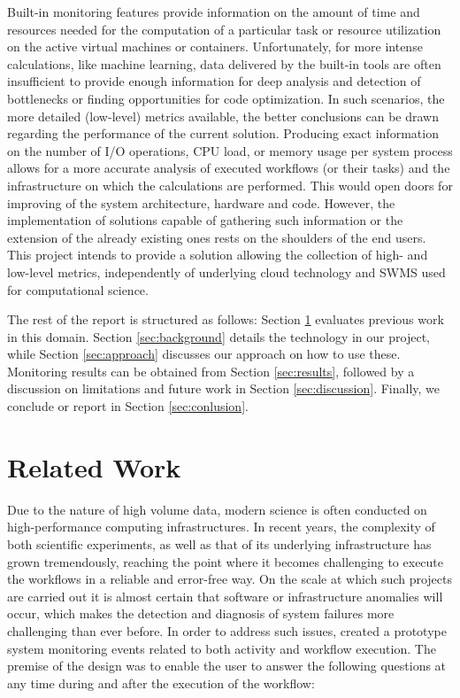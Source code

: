 \documentclass[a4paper,journal]{IEEEtran}
\begin{document}
Built-in monitoring features provide information on the amount of time and resources needed for the computation of a particular task or resource utilization on the active virtual machines or containers. Unfortunately, for more intense calculations, like machine learning, data delivered by the built-in tools are often insufficient to provide enough information for deep analysis and detection of bottlenecks or finding opportunities for code optimization. In such scenarios, the more detailed (low-level) metrics available, the better conclusions can be drawn regarding the performance of the current solution. Producing exact information on the number of I/O operations, CPU load, or memory usage per system process allows for a more accurate analysis of executed workflows (or their tasks) and the infrastructure on which the calculations are performed. This would open doors for improving of the system architecture, hardware and code. However, the implementation of solutions capable of gathering such information or the extension of the already existing ones rests on the shoulders of the end users. This project intends to provide a solution allowing the collection of high- and low-level metrics, independently of underlying cloud technology and SWMS used for computational science.

The rest of the report is structured as follows: Section \ref{sec:related-work} evaluates previous work in this domain. Section \ref{sec:background} details the technology in our project, while Section \ref{sec:approach} discusses our approach on how to use these. Monitoring results can be obtained from Section \ref{sec:results}, followed by a discussion on limitations and future work in Section \ref{sec:discussion}. Finally, we conclude or report in Section \ref{sec:conlusion}.


\section{Related Work}
\label{sec:related-work}
Due to the nature of high volume data, modern science is often conducted on high-performance computing infrastructures. In recent years, the complexity of both scientific experiments, as well as that of its underlying infrastructure has grown tremendously, reaching the point where it becomes challenging to execute the workflows in a reliable and error-free way. On the scale at which such projects are carried out it is almost certain that software or infrastructure anomalies will occur, which makes the detection and diagnosis of system failures more challenging than ever before. In order to address such issues, \citeauthor{valerio2008capturingworkflowevent} created a prototype system monitoring events related to both activity and workflow execution. The premise of the design was to enable the user to answer the following questions at any time during and after the execution of the workflow:
\end{document}
